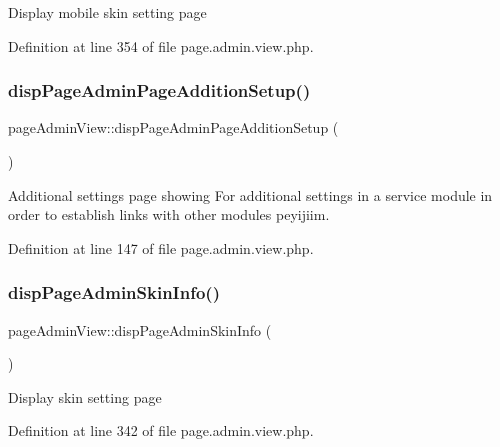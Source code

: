 Display mobile skin setting page 

Definition at line 354 of file page.\+admin.\+view.\+php.

\hypertarget{classpageAdminView_aad653a82f425e9af960d9ee3998d8662}{}\label{classpageAdminView_aad653a82f425e9af960d9ee3998d8662} 
\subsubsection{\texorpdfstring{disp\+Page\+Admin\+Page\+Addition\+Setup()}{dispPageAdminPageAdditionSetup()}}
{\footnotesize\ttfamily page\+Admin\+View\+::disp\+Page\+Admin\+Page\+Addition\+Setup (\begin{DoxyParamCaption}{ }\end{DoxyParamCaption})}



Additional settings page showing For additional settings in a service module in order to establish links with other modules peyijiim. 



Definition at line 147 of file page.\+admin.\+view.\+php.

\hypertarget{classpageAdminView_a1363d4ec28d54542578fd7d91455a7bd}{}\label{classpageAdminView_a1363d4ec28d54542578fd7d91455a7bd} 
\subsubsection{\texorpdfstring{disp\+Page\+Admin\+Skin\+Info()}{dispPageAdminSkinInfo()}}
{\footnotesize\ttfamily page\+Admin\+View\+::disp\+Page\+Admin\+Skin\+Info (\begin{DoxyParamCaption}{ }\end{DoxyParamCaption})}

Display skin setting page 

Definition at line 342 of file page.\+admin.\+view.\+php.

\hypertarget{classpageAdminView_a1b0aaafae4f1de46ba2388457f8ef2cb}{}\label{classpageAdminView_a1b0aaafae4f1de46ba2388457f8ef2cb} 
